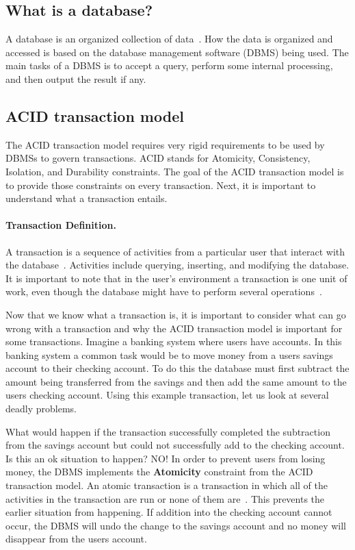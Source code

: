 \documentclass[12pt]{ucthesis}
\begin{document}
\subsection{What is a database?}
A database is an organized collection of data~\cite{database_def}. How the data is organized and accessed is based on the database management software (DBMS) being used. The main tasks of a DBMS is to accept a query, perform some internal processing, and then output the result if any.

\subsection{ACID transaction model}
The ACID transaction model requires very rigid requirements to be used by DBMSs to govern transactions. ACID 
stands for Atomicity, Consistency, Isolation, and Durability constraints. The goal of the ACID transaction model is to provide those constraints on every transaction. Next, it is important to understand what a transaction entails.

\paragraph{Transaction Definition.}
A transaction is a sequence of activities from a particular user that interact with the database~\cite{acid_def}. Activities include querying, inserting, and modifying the database. It is important to note that in the user's environment a transaction is one unit of work, even though the database might have to perform several operations~\cite{acid_def}.

Now that we know what a transaction is, it is important to consider what can go wrong with a transaction and why the ACID transaction model is important for some transactions. Imagine a banking system where users have accounts. In this banking system a common task would be to move money from a users savings account to their checking account. To do this the database must first subtract the amount being transferred from the savings and then add the same amount to the users checking account. Using this example transaction, let us look at several deadly problems.

What would happen if the transaction successfully completed the subtraction from the savings account but could not successfully add to the checking account. Is this an ok situation to happen? NO! In order to prevent users from losing money, the DBMS implements the \textbf{Atomicity} constraint from the ACID transaction model. An atomic transaction is a transaction in which all of the activities in the transaction are run or none of them are~\cite{acid_def}. This prevents the earlier situation from happening. If addition into the checking account cannot occur, the DBMS will undo the change to the savings account and no money will disappear from the users account.
\end{document}
